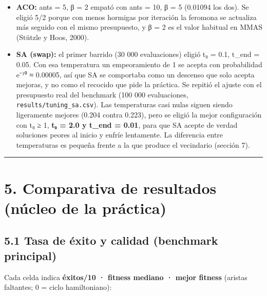 \documentclass[
  spanish,
  12pt,
]{article}
\providecommand{\tightlist}{%
  \setlength{\itemsep}{0pt}\setlength{\parskip}{0pt}}
\begin{document}
\begin{itemize}
\tightlist
\item
  \textbf{ACO:} ants = 5, β = 2 empató con ants = 10, β = 5 (0.01094 los
  dos). Se eligió 5/2 porque con menos hormigas por iteración la
  feromona se actualiza más seguido con el mismo presupuesto, y β = 2 es
  el valor habitual en MMAS (Stützle y Hoos, 2000).
\item
  \textbf{SA (swap):} el primer barrido (30 000 evaluaciones) eligió t₀
  = 0.1, t\_end = 0.05. Con esa temperatura un empeoramiento de 1 se
  acepta con probabilidad e⁻¹⁰ ≈ 0.00005, así que SA se comportaba como
  un descenso que solo acepta mejoras, y no como el recocido que pide la
  práctica. Se repitió el ajuste con el presupuesto real del benchmark
  (100 000 evaluaciones, \texttt{results/tuning\_sa.csv}). Las
  temperaturas casi nulas siguen siendo ligeramente mejores (0.204
  contra 0.223), pero se eligió la mejor configuración con t₀ ≥ 1,
  \textbf{t₀ = 2.0 y t\_end = 0.01}, para que SA acepte de verdad
  soluciones peores al inicio y enfríe lentamente. La diferencia entre
  temperaturas es pequeña frente a la que produce el vecindario (sección
  7).
\end{itemize}

\begin{center}\rule{0.5\linewidth}{0.5pt}\end{center}

\section{5. Comparativa de resultados (núcleo de la
práctica)}\label{comparativa-de-resultados-nuxfacleo-de-la-pruxe1ctica}

\subsection{5.1 Tasa de éxito y calidad (benchmark
principal)}\label{tasa-de-uxe9xito-y-calidad-benchmark-principal}

Cada celda indica \textbf{éxitos/10 · fitness mediano · mejor fitness}
(aristas faltantes; 0 = ciclo hamiltoniano):
\end{document}
